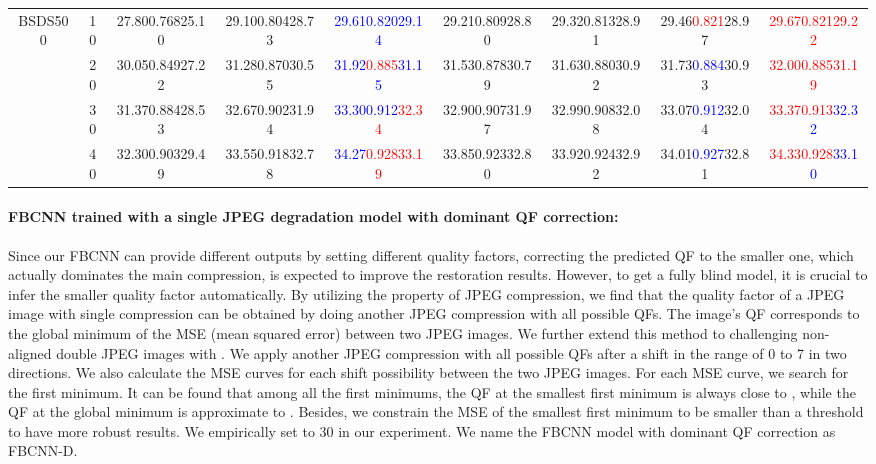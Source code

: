 \documentclass[10pt,twocolumn,letterpaper]{article}
\begin{document}
\begin{table*}[hbt!]
\begin{center}
{\begin{tabular}{ c c |c c c c c c c }
\hline
 \multirow{4}{4em}{BSDS500} 
 &10 & 27.800.76825.10  & 29.100.80428.73 & \textcolor{blue}{29.61}\textcolor{blue}{0.820}\textcolor{blue}{29.14}& 29.210.80928.80& 29.320.81328.91 & 29.46\textcolor{red}{0.821}28.97 & \textcolor{red}{29.67}\textcolor{red}{0.821}\textcolor{red}{29.22} \\ 
 &20& 30.050.84927.22 & 31.280.87030.55& \textcolor{blue}{31.92}\textcolor{red}{0.885}\textcolor{blue}{31.15}& 31.530.87830.79&  31.630.88030.92 & 31.73\textcolor{blue}{0.884}30.93 & \textcolor{red}{32.00}\textcolor{red}{0.885}\textcolor{red}{31.19} \\ 
 &30 & 31.370.88428.53 & 32.670.90231.94& \textcolor{blue}{33.30}\textcolor{blue}{0.912}\textcolor{red}{32.34}& 32.900.90731.97&  32.990.90832.08 & 33.07\textcolor{blue}{0.912}32.04 & \textcolor{red}{33.37}\textcolor{red}{0.913}\textcolor{blue}{32.32} \\ 
 &40 & 32.300.90329.49 & 33.550.91832.78& \textcolor{blue}{34.27}\textcolor{red}{0.928}\textcolor{red}{33.19}& 33.850.92332.80&  33.920.92432.92 & 34.01\textcolor{blue}{0.927}32.81 & \textcolor{red}{34.33}\textcolor{red}{0.928}\textcolor{blue}{33.10} \\ 
 
 \hline
\end{tabular}
}
\end{center}
\label{tab: singlecompare}
\end{table*}










\paragraph{FBCNN trained with a single JPEG degradation model with dominant QF correction:} Since our FBCNN can provide different outputs by setting different quality factors, correcting the predicted QF to the smaller one, which actually dominates the main compression, is expected to improve the restoration results. However, to get a fully blind model, it is crucial to infer the smaller quality factor automatically. By utilizing the property of JPEG compression, we find that the quality factor of a JPEG image with single compression can be obtained by doing another JPEG compression with all possible QFs. The image's QF corresponds to the global minimum of the MSE (mean squared error) between two JPEG images. We further extend this method to challenging non-aligned double JPEG images with   . We apply another JPEG compression with all possible QFs after a shift in the range of 0 to 7 in two directions. We also calculate the MSE curves for each shift possibility between the two JPEG images. For each MSE curve, we search for the first minimum. It can be found that among all the first minimums, the QF at the smallest first minimum is always close to , while the QF at the global minimum is approximate to . Besides, we constrain the MSE of the smallest first minimum to be smaller than a threshold  to have more robust results. We empirically set  to 30 in our experiment. We name the FBCNN model with dominant QF correction as FBCNN-D.
\end{document}
